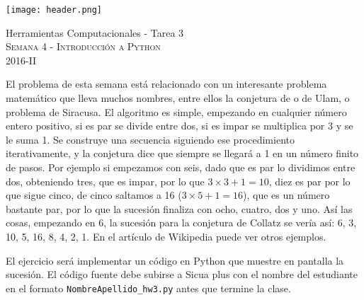 \documentclass[11pt,letterpaper]{exam}
\begin{document}
\begin{center}

\texttt{[image: header.png]}

\vspace{1.0cm}
{\Large Herramientas Computacionales - Tarea 3} \\
\textsc{Semana 4 - Introducci\'on a Python}\\
2016-II\\
\end{center}



\vspace{0.5cm}

\noindent
El problema de esta semana est\'a relacionado con un interesante problema matem\'atico que lleva muchos nombres, entre ellos la conjetura de  o de Ulam, o problema de Siracusa. El algoritmo es simple, empezando en cualquier n\'umero entero positivo, si es par se divide entre dos, si es impar se multiplica por 3 y se le suma 1. Se construye una secuencia siguiendo ese procedimiento iterativamente, y la conjetura dice que siempre se llegará a 1 en un n\'umero finito de pasos. Por ejemplo si empezamos con seis, dado que es par lo dividimos entre dos, obteniendo tres, que es impar, por lo que $3 \times 3+1=10$, diez es par por lo que sigue cinco, de cinco saltamos a 16 ($3\times 5 + 1=16$), que es un n\'umero bastante par, por lo que la sucesi\'on finaliza con ocho, cuatro, dos y uno. As\'i las cosas, empezando en 6, la sucesi\'on para la conjetura de Collatz se ver\'ia as\'i: 6, 3, 10, 5, 16, 8, 4, 2, 1. En el art\'iculo de Wikipedia puede ver otros ejemplos.

El ejercicio ser\'a implementar un c\'odigo en Python que muestre en pantalla la sucesi\'on. El c\'odigo fuente debe subirse a Sicua plus con el nombre del estudiante en el formato \verb"NombreApellido_hw3.py" antes que termine la clase. 

\vspace{0.5cm}
\end{document}
